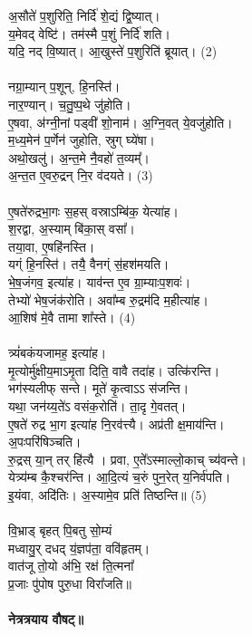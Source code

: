 अ॒सौते॑ प॒शुरिति॒ निर्दि॑ शे॒द्यं द्वि॒ष्यात्। \\
य॒मेवद् वेष्टि॑। तम॑स्मै प॒शुं निर्दि॑ शति। \\
यदि॒ नद् वि॒ष्यात्। आ॒खुस्ते॑ प॒शुरिति॑ ब्रूयात्। (2)\\
\\
नग्रा॒म्यान् प॒शून्, हि॒नस्ति॑। \\
नार॒ण्यान्। च॒तु॒ष्प॒थे जु॑होति।\\
ए॒षवा, अ॑ग्नी॒नां पड्वी॑ शो॒नाम॑। अ॒ग्नि॒वत् ये॒वजु॑होति। \\
म॒ध्य॒मेन॑ प॒र्णेन॑ जुहोति, स्रुग् घ्ये॑षा। \\
अथो॒खलु॑। अ॒न्त॒मे नै॒वहो॑ त॒व्यम्‌᳚। \\
अ॒न्त॒त ए॒वरु॒द्रन् नि॒र व॑दयते। (3)\\
\\
ए॒षते॑रुद्रभा॒गः स॒हस् वस्राऽम्बि॑क॒ येत्या॑ह। \\
श॒रद्वा, अ॒स्याम् बि॑का॒स् वसा᳚। \\
तया॒वा, ए॒षहि॑नस्ति।\\
यग्ं हि॒नस्ति॑। तयै॒ वैनग्ं स॒॑हश॑मयति। \\
भे॒ष॒जंगव॒ इत्या॑ह। याव॑न्त ए॒व ग्रा॒म्याःप॒शवः॑।\\
तेभ्यो॑ भेष॒जंक॑रोति। अवा᳚म्ब रु॒द्रम॑दि म॒हीत्या॑ह। \\
आ॒शिष॑ मे॒वै तामा शा᳚स्ते। (4)\\
\\
त्र्यं॑बकंयजामह॒ इत्या॑ह। \\
मृ॒त्योर्मु॑क्षीय॒माऽमृ॒ता दिति॒ वावै तदा॑ह। उत्कि॑रन्ति।\\
भग॑स्यलीफ् सन्ते। मूते॑ कृ॒त्वाऽऽ स॑जन्ति। \\
यथा॒ जन॑य्य॒ते॑ऽ वसंक॒रोति॑। ता॒दृ गे॒वतत्।\\
ए॒षते॑ रुद्र भा॒ग इत्या॑ह नि॒रव॑त्त्यै। अप्र॑ती क्ष॒माय॑न्ति। \\
अ॒पःपरि॑षिञ्चति। \\
रु॒द्रस् या॒न् तर् हि॑त्यै । प्रवा, ए॒ते᳚ऽस्माल्लो॒काच् च्य॑वन्ते। \\
येत्र्य॑म्ब कै॒श्चर॑न्ति। आ॒दि॒त्यं च॒रुं पुन॒रेत् य॒निर्व॑पति।\\
इ॒यंवा, अदि॑तिः। अ॒स्यामे॒व प्रति॑ तिष्ठन्ति॥ (5)\\
\\
{\small वि॒भ्राड् बृहत् पि॒बतु सो॒म्यं \\
मध्वायु॒र् दधद् य॒॑ज्ञप॑ता॒ ववि॑हृतम्।\\
वात॑जू तो॒यो अ॑भि॒ रक्ष॑ ति॒त्मना᳚ \\
प्र॒जाः पु॑पोष पुरु॒धा विरा᳚जति॥}\\
\\
\textbf{नेत्रत्रयाय वौषट्॥}\\
